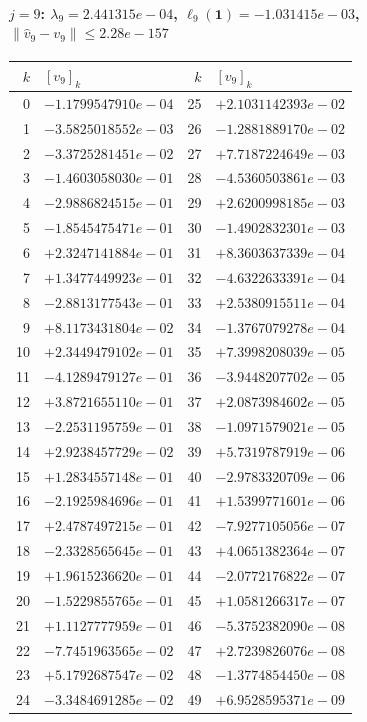 \documentclass[11pt]{article}
\begin{document}
\paragraph{$j = 9$: $\lambda_{9} = 2.441315e-04$, \quad $\ell_{9}(\mathbf{1}) = -1.031415e-03$, \quad $\|\hat v_{9} - v_{9}\| \leq 2.28e-157$}
\begin{center}
{\footnotesize
\begin{tabular}{r@{\;\;}l@{\quad}r@{\;\;}l}
\toprule
$k$ & $[v_{9}]_k$ & $k$ & $[v_{9}]_k$ \\
\midrule
0 & $-1.1799547910e-04$ & 25 & $+2.1031142393e-02$ \\
1 & $-3.5825018552e-03$ & 26 & $-1.2881889170e-02$ \\
2 & $-3.3725281451e-02$ & 27 & $+7.7187224649e-03$ \\
3 & $-1.4603058030e-01$ & 28 & $-4.5360503861e-03$ \\
4 & $-2.9886824515e-01$ & 29 & $+2.6200998185e-03$ \\
5 & $-1.8545475471e-01$ & 30 & $-1.4902832301e-03$ \\
6 & $+2.3247141884e-01$ & 31 & $+8.3603637339e-04$ \\
7 & $+1.3477449923e-01$ & 32 & $-4.6322633391e-04$ \\
8 & $-2.8813177543e-01$ & 33 & $+2.5380915511e-04$ \\
9 & $+8.1173431804e-02$ & 34 & $-1.3767079278e-04$ \\
10 & $+2.3449479102e-01$ & 35 & $+7.3998208039e-05$ \\
11 & $-4.1289479127e-01$ & 36 & $-3.9448207702e-05$ \\
12 & $+3.8721655110e-01$ & 37 & $+2.0873984602e-05$ \\
13 & $-2.2531195759e-01$ & 38 & $-1.0971579021e-05$ \\
14 & $+2.9238457729e-02$ & 39 & $+5.7319787919e-06$ \\
15 & $+1.2834557148e-01$ & 40 & $-2.9783320709e-06$ \\
16 & $-2.1925984696e-01$ & 41 & $+1.5399771601e-06$ \\
17 & $+2.4787497215e-01$ & 42 & $-7.9277105056e-07$ \\
18 & $-2.3328565645e-01$ & 43 & $+4.0651382364e-07$ \\
19 & $+1.9615236620e-01$ & 44 & $-2.0772176822e-07$ \\
20 & $-1.5229855765e-01$ & 45 & $+1.0581266317e-07$ \\
21 & $+1.1127777959e-01$ & 46 & $-5.3752382090e-08$ \\
22 & $-7.7451963565e-02$ & 47 & $+2.7239826076e-08$ \\
23 & $+5.1792687547e-02$ & 48 & $-1.3774854450e-08$ \\
24 & $-3.3484691285e-02$ & 49 & $+6.9528595371e-09$ \\
\bottomrule
\end{tabular}
}
\end{center}
\end{document}
